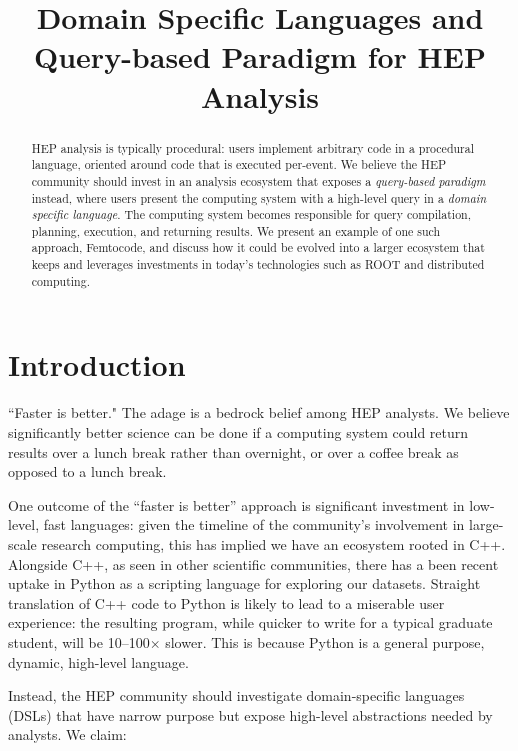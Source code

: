 \documentclass{article}
\begin{document}
\title{Domain Specific Languages and \\ Query-based Paradigm for HEP Analysis}

\maketitle

\begin{abstract}
HEP analysis is typically procedural: users implement arbitrary code in a procedural language,  oriented around code that is executed per-event. We believe the HEP community should invest in an analysis ecosystem that exposes a {\it query-based paradigm} instead, where users present the computing system with a high-level query in a {\it domain specific language}.  The computing system becomes responsible for query compilation, planning, execution, and returning results. We present an example of one such approach, Femtocode, and discuss how it could be evolved into a larger ecosystem that keeps and leverages investments in today's technologies such as ROOT and distributed computing.
\end{abstract}

\section{Introduction}

``Faster is better." The adage is a bedrock belief among HEP analysts. We believe significantly better science can be done if a computing system could return results over a lunch break rather than overnight, or over a coffee break as opposed to a lunch break.

One outcome of the ``faster is better'' approach is significant investment in low-level, fast languages: given the timeline of the community's involvement in large-scale research computing, this has implied we have an ecosystem rooted in C++. Alongside C++, as seen in other scientific communities, there has a been recent uptake in Python as a scripting language for exploring our datasets.  Straight translation of C++ code to Python is likely to lead to a miserable user experience: the resulting program, while quicker to write for a typical graduate student, will be 10--100$\times$ slower. This is because Python is a general purpose, dynamic, high-level language.

Instead, the HEP community should investigate domain-specific languages (DSLs) that have narrow purpose but expose high-level abstractions needed by analysts\footnotemark. We claim:
\end{document}
